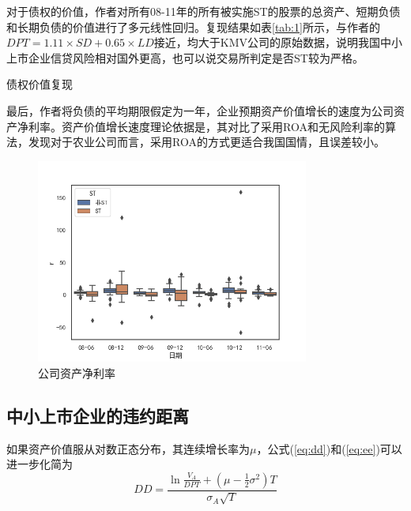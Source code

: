 \documentclass[a4paper,12pt]{ctexart}
\begin{document}
对于债权的价值，作者对所有08-11年的所有被实施ST的股票的总资产、短期负债和长期负债的价值进行了多元线性回归。复现结果如表\ref{tab:1}所示，与作者的$DPT = 1.11\times SD+0.65\times LD$接近，均大于KMV公司的原始数据，说明我国中小上市企业信贷风险相对国外更高，也可以说交易所判定是否ST较为严格。
\begin{table}[H]
    \small
    \caption{债权价值复现}\label{tab:1}
\end{table}

最后，作者将负债的平均期限假定为一年，企业预期资产价值增长的速度为公司资产净利率。资产价值增长速度理论依据是\citet{夏红芳2007基于}，其对比了采用ROA和无风险利率的算法，发现对于农业公司而言，采用ROA的方式更适合我国国情，且误差较小。
\begin{figure}[H]
    \centering
    \includegraphics[width=0.8\textwidth]{img/r.png}
    \caption{公司资产净利率}
\end{figure}
\subsection{中小上市企业的违约距离}
如果资产价值服从对数正态分布，其连续增长率为$\mu$，公式(\ref{eq:dd})和(\ref{eq:ee})可以进一步化简为
\begin{equation}
    DD=\frac{\ln \frac{V_A}{DPT}+(\mu-\frac{1}{2}\sigma^2)T}{\sigma_A\sqrt{T}}
\end{equation}
\end{document}
